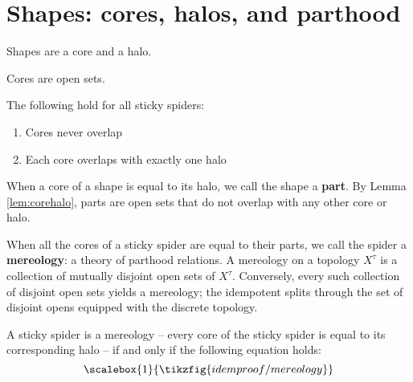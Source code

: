 
\section{Shapes: cores, halos, and parthood}

\begin{defn}[Shape]
Shapes are a core and a halo.
\end{defn}

\begin{defn}[Core]
Cores are open sets.
\end{defn}

\begin{defn}[Halo]
\end{defn}

\begin{lemma}\label{lem:corehalo} The following hold for all sticky spiders:\\
\begin{enumerate}
\item{Cores never overlap}
\item{Each core overlaps with exactly one halo}
\end{enumerate}
\end{lemma}

\begin{example}

\end{example}

\begin{defn}[Parts]
When a core of a shape is equal to its halo, we call the shape a \textbf{part}. By Lemma \ref{lem:corehalo}, parts are open sets that do not overlap with any other core or halo.
\end{defn}

\begin{defn}[Mereology]
 When all the cores of a sticky spider are equal to their parts, we call the spider a \textbf{mereology}: a theory of parthood relations. A mereology on a topology $X^\tau$ is a collection of mutually disjoint open sets of $X^\tau$. Conversely, every such collection of disjoint open sets yields a mereology; the idempotent splits through the set of disjoint opens equipped with the discrete topology.
\end{defn}

\begin{proposition}
A sticky spider is a mereology -- every core of the sticky spider is equal to its corresponding halo -- if and only if the following equation holds:
\[\scalebox{1}{\tikzfig{idemproof/mereology}}\]
\end{proposition}

\begin{example}

\end{example}